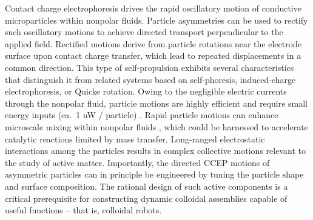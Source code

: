 Contact charge electrophoresis drives the rapid oscillatory motion of conductive microparticles within nonpolar fluids.
Particle asymmetries can be used to rectify such oscillatory motions to achieve directed transport perpendicular to the applied field.
Rectified motions derive from particle rotations near the electrode surface upon contact charge transfer, which lead to repeated displacements in a common direction.
This type of self-propulsion exhibits several characteristics that distinguish it from related systems based on self-phoresis, induced-charge electrophoresis, or Quicke rotation.
Owing to the negligible electric currents through the nonpolar fluid, particle motions are highly efficient and require small energy inputs (ca.~1 nW / particle) \cite{drews2015contact}. 
Rapid particle motions can enhance microscale mixing within nonpolar fluids \cite{cartier2014microfluidic}, which could be harnessed to accelerate catalytic reactions limited by mass transfer.
Long-ranged electrostatic interactions among the particles results in complex collective motions relevant to the study of active matter.
Importantly, the directed CCEP motions of asymmetric particles can in principle be engineered by tuning the particle shape and surface composition.
The rational design of such active components is a critical prerequisite for constructing dynamic colloidal assemblies capable of useful functions -- that is, colloidal robots.









